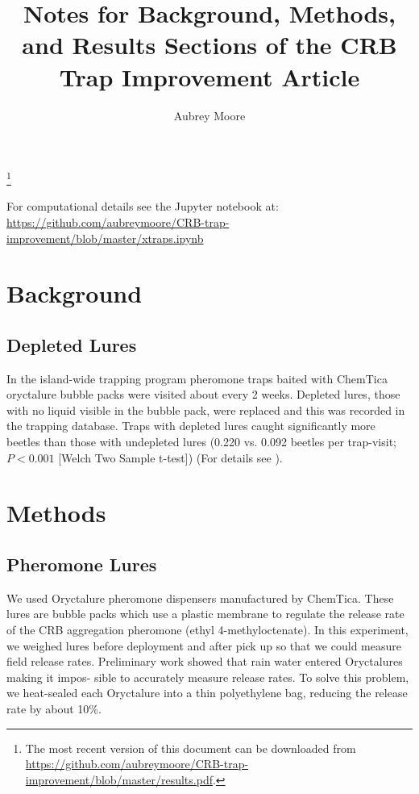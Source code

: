 \documentclass[12pt,letterpaper,english,bibliography=totocnumbered, abstract=on]{scrartcl}
\begin{document}

\title{Notes for Background, Methods, and Results Sections of the CRB Trap Improvement Article}

\author{Aubrey Moore}

\date{\DTMnow}


\maketitle

\tableofcontents

\footnote{The most recent version of this document can be downloaded from\\
\url{https://github.com/aubreymoore/CRB-trap-improvement/blob/master/results.pdf}.}

\pagebreak

For computational details see the Jupyter notebook at:\\
\url{https://github.com/aubreymoore/CRB-trap-improvement/blob/master/xtraps.ipynb}

\section{Background}

\subsection{Depleted Lures}

In the island-wide trapping program pheromone traps baited with ChemTica oryctalure bubble packs were visited about every 2 weeks. Depleted lures, those with no liquid visible in the bubble pack,  were replaced and this was recorded in the trapping database. Traps with depleted lures caught significantly more beetles than those with undepleted lures (0.220 vs. 0.092 beetles per trap-visit; $P<0.001$ [Welch Two Sample t-test]) (For details see \cite{moore_research_2012}).

\section{Methods}

\subsection{Pheromone Lures}

We used Oryctalure pheromone dispensers manufactured by ChemTica. These lures are bubble packs which use a plastic
membrane to regulate the release rate of the CRB aggregation pheromone (ethyl 4-methyloctenate).
In this experiment, we weighed lures before deployment and after pick up so that we could measure
field release rates. Preliminary work showed that rain water entered Oryctalures making it impos-
sible to accurately measure release rates. To solve this problem, we heat-sealed each Oryctalure
into a thin polyethylene bag, reducing the release rate by about 10\%. 
\end{document}
